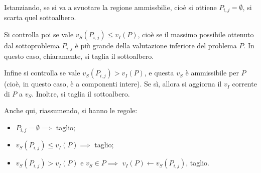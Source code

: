 \documentclass[a4paper,11pt]{article}
\begin{document}
Istanziando, se si va a svuotare la regione ammissbilie, cioè si ottiene $P_{i,j} = \emptyset$, si scarta quel sottoalbero.

Si controlla poi se vale $v_S(P_{i, j}) \leq v_I (P)$, cioè se il massimo possibile ottenuto dal sottoproblema $P_{i,j}$ è più grande della valutazione inferiore del problema $P$. In questo caso, chiaramente, si taglia il sottoalbero.

Infine si controlla se vale $v_S(P_{i,j}) > v_I(P)$, e questa $v_S$ è ammissibile per $P$ (cioè, in questo caso, è a componenti intere). Se sì, allora si aggiorna il $v_I$ corrente di $P$ a $v_S$. 
Inoltre, si taglia il sottoalbero.

Anche qui, riassumendo, si hanno le regole:
\begin{itemize}
	\item $P_{i,j} = \emptyset \implies $ taglio;
	\item $v_S(P_{i,j}) \leq v_I(P) \implies $ taglio;
	\item $v_S(P_{i,j}) > v_I(P)$ e $v_S \in P \implies $ $v_I(P) \leftarrow v_S(P_{i,j})$, taglio.
\end{itemize}
\end{document}
